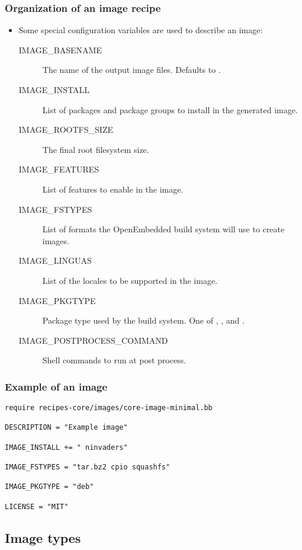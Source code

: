 \begin{frame}
  \frametitle{Organization of an image recipe}
  \begin{itemize}
    \item Some special configuration variables are used to describe an
      image:
      \begin{description}
        \item[IMAGE\_BASENAME] The name of the output image files.
          Defaults to .
        \item[IMAGE\_INSTALL] List of packages and package groups to
          install in the generated image.
        \item[IMAGE\_ROOTFS\_SIZE] The final root filesystem size.
        \item[IMAGE\_FEATURES] List of features to enable in the
          image.
        \item[IMAGE\_FSTYPES] List of formats the OpenEmbedded build
          system will use to create images.
        \item[IMAGE\_LINGUAS] List of the locales to be supported in
          the image.
        \item[IMAGE\_PKGTYPE] Package type used by the build system.
          One of , ,  and .
        \item[IMAGE\_POSTPROCESS\_COMMAND] Shell commands to run at
          post process.
      \end{description}
  \end{itemize}
\end{frame}

\begin{frame}[fragile]
  \frametitle{Example of an image}
  \begin{block}{}
    \begin{verbatim}
require recipes-core/images/core-image-minimal.bb

DESCRIPTION = "Example image"

IMAGE_INSTALL += " ninvaders"

IMAGE_FSTYPES = "tar.bz2 cpio squashfs"

IMAGE_PKGTYPE = "deb"

LICENSE = "MIT"
    \end{verbatim}
  \end{block}
\end{frame}

\subsection{Image types}

